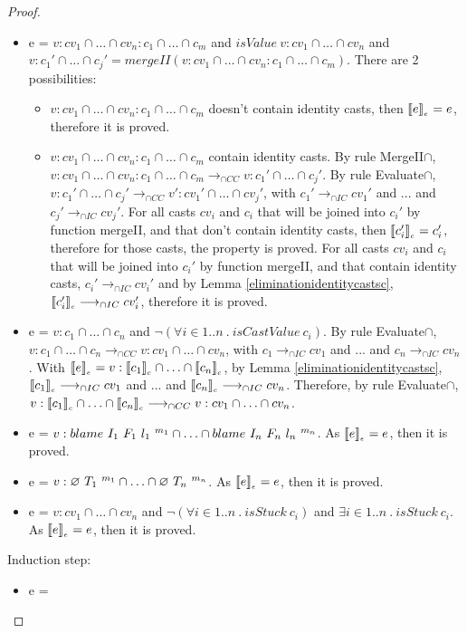 \documentclass[a4paper]{article}
\begin{document}
\begin{proof}
\begin{itemize}
\begin{itemize}
    \end{itemize}
    \item e = $v : cv_1 \cap \ldots \cap cv_n : c_1 \cap \ldots \cap c_m$ and $isValue\ v : cv_1 \cap \ldots \cap cv_n$ and $v : c_1' \cap \ldots \cap c_j' = mergeII (v : cv_1 \cap \ldots \cap cv_n : c_1 \cap \ldots \cap c_m)$.
    There are 2 possibilities:
    \begin{itemize}
        \item $v : cv_1 \cap \ldots \cap cv_n : c_1 \cap \ldots \cap c_m$ doesn't contain identity casts, then $\llbracket e \rrbracket_{_e} = e$, therefore it is proved.
        \item $v : cv_1 \cap \ldots \cap cv_n : c_1 \cap \ldots \cap c_m$ contain identity casts.
        By rule MergeII$\cap$, $v : cv_1 \cap \ldots \cap cv_n : c_1 \cap \ldots \cap c_m \longrightarrow_{\cap CC} v : c_1' \cap \ldots \cap c_j'$.
        By rule Evaluate$\cap$, $v : c_1' \cap \ldots \cap c_j' \longrightarrow_{\cap CC} v' : cv_1' \cap \ldots \cap cv_j'$, with $c_1' \longrightarrow_{\cap IC} cv_1'$ and ... and $c_j' \longrightarrow_{\cap IC} cv_j'$.
        For all casts $cv_i$ and $c_i$ that will be joined into $c_i'$ by function mergeII, and that don't contain identity casts, then $\llbracket c_i' \rrbracket_{_c} = c_i'$, therefore for those casts, the property is proved.
        For all casts $cv_i$ and $c_i$ that will be joined into $c_i'$ by function mergeII, and that contain identity casts, $c_i' \longrightarrow_{\cap IC} cv_i'$ and by Lemma \ref{eliminationidentitycastsc}, $\llbracket c_i' \rrbracket_{_c} \longrightarrow_{\cap IC} cv_i'$, therefore it is proved.
    \end{itemize}
    \item e = $v : c_1 \cap \ldots \cap c_n$ and $\neg(\forall i \in 1 .. n\ .\ isCastValue\ c_i)$.
    By rule Evaluate$\cap$, $v : c_1 \cap \ldots \cap c_n \longrightarrow_{\cap CC} v : cv_1 \cap \ldots \cap cv_n$, with $c_1 \longrightarrow_{\cap IC} cv_1$ and ... and $c_n \longrightarrow_{\cap IC} cv_n$.
    With $\llbracket e \rrbracket_{_e} = v : \llbracket c_1 \rrbracket_{_c} \cap \ldots \cap \llbracket c_n \rrbracket_{_c}$, by Lemma \ref{eliminationidentitycastsc}, $\llbracket c_1 \rrbracket_{_c} \longrightarrow_{\cap IC} cv_1$ and ... and $\llbracket c_n \rrbracket_{_c} \longrightarrow_{\cap IC} cv_n$.
    Therefore, by rule Evaluate$\cap$, $v : \llbracket c_1 \rrbracket_{_c} \cap \ldots \cap \llbracket c_n \rrbracket_{_c} \longrightarrow_{\cap CC} v : cv_1 \cap \ldots \cap cv_n$.
    \item e = $v : blame\ I_1\ F_1\ l_1\ ^{m_1} \cap \ldots \cap blame\ I_n\ F_n\ l_n\ ^{m_n}$.
    As $\llbracket e \rrbracket_{_e} = e$, then it is proved.
    \item e = $v : \varnothing\ T_1\ ^{m_1} \cap \ldots \cap \varnothing\ T_n\ ^{m_n}$.
    As $\llbracket e \rrbracket_{_e} = e$, then it is proved.
    \item e = $v : cv_1 \cap \ldots \cap cv_n$ and $\neg(\forall i \in 1 .. n\ .\ isStuck\ c_i)$ and $\exists i \in 1 .. n\ .\ isStuck\ c_i$.
    As $\llbracket e \rrbracket_{_e} = e$, then it is proved.

\end{itemize}
Induction step:
\begin{itemize}
    \item e =
\end{itemize}
\end{proof}
\end{document}
